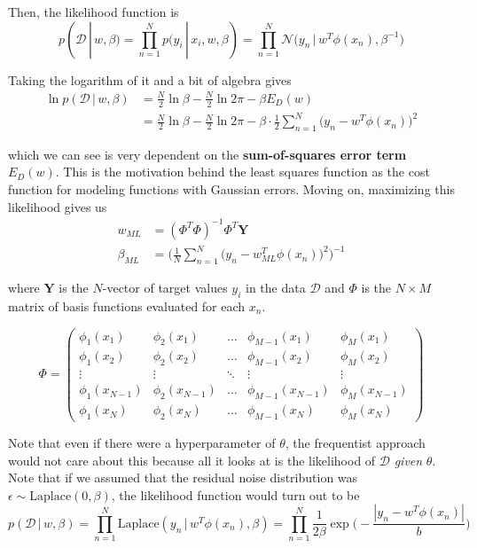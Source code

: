   Then, the likelihood function is
  \begin{equation}
    p(\mathcal{D}\,|\,w, \beta) = \prod_{n=1}^N p(y_i\,|\,x_i, w, \beta) = \prod_{n=1}^N \mathcal{N}\big( y_n \,|\, w^T \phi(x_n), \beta^{-1} \big)
  \end{equation}

  Taking the logarithm of it and a bit of algebra gives
  \begin{align*}
    \ln p(\mathcal{D}\,|\,w, \beta) & = \frac{N}{2} \ln{\beta} - \frac{N}{2} \ln{2\pi} - \beta E_D (w)\\
    & = \frac{N}{2} \ln{\beta} - \frac{N}{2} \ln{2\pi} - \beta \cdot \frac{1}{2} \sum_{n=1}^N \big(y_n - w^T \phi(x_n)\big)^2
  \end{align*}

  which we can see is very dependent on the \textbf{sum-of-squares error term} $E_D(w)$. This is the motivation behind the least squares function as the cost function for modeling functions with Gaussian errors. Moving on, maximizing this likelihood gives us
  \begin{align*}
    w_{ML} & = (\Phi^T \Phi)^{-1} \Phi^T \mathbf{Y} \\
    \beta_{ML} & = \Bigg( \frac{1}{N} \sum_{n=1}^N \big( y_n - w_{ML}^T \phi(x_n)\big)^2 \Bigg)^{-1}
  \end{align*}

  where $\mathbf{Y}$ is the $N$-vector of target values $y_i$ in the data $\mathcal{D}$ and $\Phi$ is the $N \times M$ matrix of basis functions evaluated for each $x_n$.

  \begin{equation}
    \Phi = \begin{pmatrix}
      \phi_1 (x_1) & \phi_2 (x_1) & \ldots & \phi_{M-1} (x_1) & \phi_M (x_1) \\
      \phi_1 (x_2) & \phi_2 (x_2) & \ldots & \phi_{M-1} (x_2) & \phi_M (x_2) \\
      \vdots & \vdots & \ddots & \vdots & \vdots \\
      \phi_1 (x_{N-1}) & \phi_2 (x_{N-1}) & \ldots & \phi_{M-1} (x_{N-1}) & \phi_M (x_{N-1}) \\
      \phi_1 (x_N) & \phi_2 (x_N) & \ldots & \phi_{M-1} (x_N) & \phi_M (x_N)
    \end{pmatrix}
  \end{equation}

  Note that even if there were a hyperparameter of $\theta$, the frequentist approach would not care about this because all it looks at is the likelihood of $\mathcal{D}$ \textit{given} $\theta$. Note that if we assumed that the residual noise distribution was $\epsilon \sim \text{Laplace}(0, \beta)$, the likelihood function would turn out to be
  \begin{equation}
    p(\mathcal{D}\,|\,w, \beta) = \prod_{n=1}^N \text{Laplace}(y_n\,|\,w^T \phi(x_n), \beta) = \prod_{n=1}^N \frac{1}{2\beta} \exp\bigg(- \frac{|y_n - w^T \phi(x_n)|}{b} \bigg)
  \end{equation}


